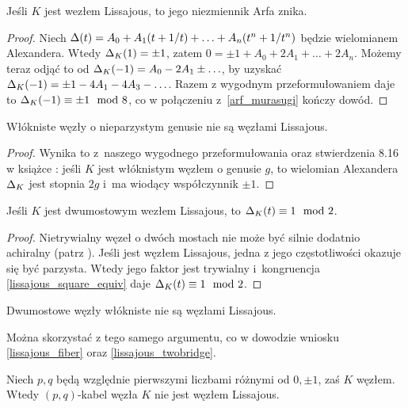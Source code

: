 \begin{corollary}
    Jeśli $K$ jest wezłem Lissajous, to jego niezmiennik Arfa znika.
\end{corollary}

\begin{proof}
    Niech $\Delta(t) = A_0 + A_1(t+1/t) + \ldots + A_n(t^n + 1/t^n)$ będzie  wielomianem Alexandera.
    Wtedy $\Delta_K(1) = \pm 1$, zatem $0 = \pm 1 + A_0 + 2A_1 + \ldots + 2A_n$.
    Możemy teraz odjąć to od $\Delta_K(-1) = A_0 - 2A_1 \pm \ldots$, by uzyskać $\Delta_K(-1) = \pm 1 - 4A_1 - 4A_3 - \ldots$.
    Razem z wygodnym przeformułowaniem daje to $\Delta_K(-1) \equiv \pm 1 \mod 8$, co w połączeniu z~\ref{arf_murasugi} kończy dowód.
\end{proof}

\begin{corollary}
	\label{lissajous_fiber}
    Włókniste węzły o nieparzystym genusie nie są węzłami Lissajous.
\end{corollary}

\begin{proof}
    Wynika to z~naszego wygodnego przeformułowania oraz stwierdzenia 8.16 w książce \cite{burde03}: jeśli $K$ jest włóknistym węzłem o genusie $g$, to wielomian Alexandera $\Delta_K$ jest stopnia $2g$ i~ma wiodący współczynnik $\pm 1$.
\end{proof}

\begin{corollary}
	\label{lissajous_twobridge}
    Jeśli $K$ jest dwumostowym wezłem Lissajous, to $\Delta_K(t) \equiv 1 \mod 2$.
\end{corollary}

\begin{proof}
    Nietrywialny węzeł o dwóch mostach nie może być silnie dodatnio achiralny (patrz \cite{hartley79}).
    Jeśli jest węzłem Lissajous, jedna z jego częstotliwości okazuje się być parzysta.
    Wtedy jego faktor jest trywialny i~kongruencja \ref{lissajous_square_equiv} daje $\Delta_K(t) \equiv 1 \mod 2$.
\end{proof}

\begin{corollary}
    Dwumostowe węzły włókniste nie są węzłami Lissajous.
\end{corollary}

Można skorzystać z tego samego argumentu, co w dowodzie wniosku \ref{lissajous_fiber} oraz \ref{lissajous_twobridge}.

\begin{proposition}
	Niech $p, q$ będą względnie pierwszymi liczbami różnymi od $0, \pm 1$, zaś $K$ węzłem.
	Wtedy $(p, q)$-kabel węzła $K$ nie jest węzłem Lissajous.
\end{proposition}

